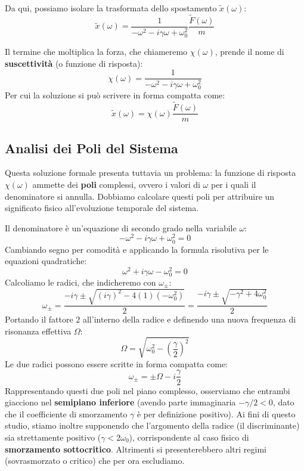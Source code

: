 Da qui, possiamo isolare la trasformata dello spostamento $\tilde{x}(\omega)$:
\begin{equation}
\tilde{x}(\omega) = \frac{1}{-\omega^2 - i\gamma\omega + \omega_0^2} \frac{\tilde{F}(\omega)}{m}
\end{equation}

Il termine che moltiplica la forza, che chiameremo $\chi(\omega)$, prende il nome di \textbf{suscettività} (o funzione di risposta):
\begin{equation}
\chi(\omega) = \frac{1}{-\omega^2 - i\gamma\omega + \omega_0^2}
\end{equation}
Per cui la soluzione si può scrivere in forma compatta come:
\begin{equation}
\tilde{x}(\omega) = \chi(\omega) \frac{\tilde{F}(\omega)}{m}
\end{equation}

\subsection{Analisi dei Poli del Sistema}
Questa soluzione formale presenta tuttavia un problema: la funzione di risposta $\chi(\omega)$ ammette dei \textbf{poli} complessi, ovvero i valori di $\omega$ per i quali il denominatore si annulla. Dobbiamo calcolare questi poli per attribuire un significato fisico all'evoluzione temporale del sistema.

Il denominatore è un'equazione di secondo grado nella variabile $\omega$:
\begin{equation}
-\omega^2 - i\gamma\omega + \omega_0^2 = 0
\end{equation}
Cambiando segno per comodità e applicando la formula risolutiva per le equazioni quadratiche:
\begin{equation}
\omega^2 + i\gamma\omega - \omega_0^2 = 0
\end{equation}
Calcoliamo le radici, che indicheremo con $\omega_{\pm}$:
\begin{equation}
\omega_{\pm} = \frac{-i\gamma \pm \sqrt{(i\gamma)^2 - 4(1)(-\omega_0^2)}}{2} = \frac{-i\gamma \pm \sqrt{-\gamma^2 + 4\omega_0^2}}{2}
\end{equation}
Portando il fattore $2$ all'interno della radice e definendo una nuova frequenza di risonanza effettiva $\Omega$:
\begin{equation}
\Omega = \sqrt{\omega_0^2 - \left(\frac{\gamma}{2}\right)^2}
\end{equation}
Le due radici possono essere scritte in forma compatta come:
\begin{equation}
\omega_{\pm} = \pm \Omega - i\frac{\gamma}{2}
\end{equation}
Rappresentando questi due poli nel piano complesso, osserviamo che entrambi giacciono nel \textbf{semipiano inferiore} (avendo parte immaginaria $-\gamma/2 < 0$, dato che il coefficiente di smorzamento $\gamma$ è per definizione positivo).
Ai fini di questo studio, stiamo inoltre supponendo che l'argomento della radice (il discriminante) sia strettamente positivo ($\gamma < 2\omega_0$), corrispondente al caso fisico di \textbf{smorzamento sottocritico}. Altrimenti si presenterebbero altri regimi (sovrasmorzato o critico) che per ora escludiamo.

